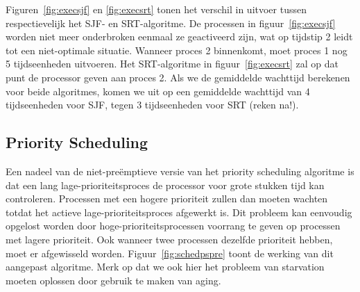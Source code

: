 Figuren~\ref{fig:execsjf} en \ref{fig:execsrt} tonen het verschil in uitvoer tussen respectievelijk het SJF- en SRT-algoritme. De processen in figuur~\ref{fig:execsjf} worden niet meer onderbroken eenmaal ze geactiveerd zijn, wat op tijdstip 2 leidt tot een niet-optimale situatie. Wanneer proces 2 binnenkomt, moet proces 1 nog 5 tijdseenheden uitvoeren. Het SRT-algoritme in figuur~\ref{fig:execsrt} zal op dat punt de processor geven aan proces 2. Als we de gemiddelde wachttijd berekenen voor beide algoritmes, komen we uit op een gemiddelde wachttijd van 4 tijdseenheden voor SJF, tegen 3 tijdseenheden voor SRT (reken na!).

\subsection{Priority Scheduling}

Een nadeel van de niet-pre\"emptieve versie van het priority scheduling algoritme is dat een lang lage-prioriteitsproces de processor voor grote stukken tijd kan controleren. Processen met een hogere prioriteit zullen dan moeten wachten totdat het actieve lage-prioriteitsproces afgewerkt is. Dit probleem kan eenvoudig opgelost worden door hoge-prioriteitsprocessen voorrang te geven op processen met lagere prioriteit. Ook wanneer twee processen dezelfde prioriteit hebben, moet er afgewisseld worden. Figuur~\ref{fig:schedpspre} toont de werking van dit aangepast algoritme. Merk op dat we ook hier het probleem van starvation moeten oplossen door gebruik te maken van aging.

